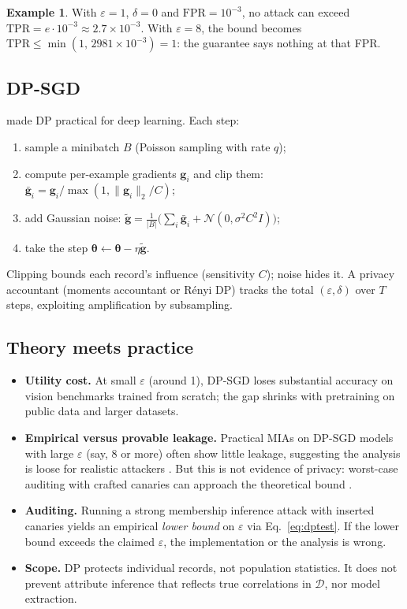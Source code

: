 \documentclass[10pt,a4paper]{extarticle}
\theoremstyle{definition}
\newtheorem{example}{Example}[section]
\newcommand{\D}{\mathcal{D}}
\newcommand{\btheta}{\boldsymbol{\theta}}
\begin{document}
\begin{example}
With \(\varepsilon=1\), \(\delta=0\) and \(\mathrm{FPR}=10^{-3}\), no attack can exceed \(\mathrm{TPR}=e\cdot10^{-3}\approx 2.7\times10^{-3}\). With \(\varepsilon=8\), the bound becomes \(\mathrm{TPR}\le\min(1,\,2981\times10^{-3})=1\): the guarantee says nothing at that FPR.
\end{example}

\subsection{DP-SGD}

\citet{abadi2016deep} made DP practical for deep learning. Each step:
\begin{enumerate}
  \item sample a minibatch \(B\) (Poisson sampling with rate \(q\));
  \item compute per-example gradients \(\mathbf{g}_i\) and clip them: \(\bar{\mathbf{g}}_i=\mathbf{g}_i/\max(1,\|\mathbf{g}_i\|_2/C)\);
  \item add Gaussian noise: \(\tilde{\mathbf{g}}=\frac{1}{|B|}\big(\sum_i\bar{\mathbf{g}}_i+\mathcal{N}(0,\sigma^2C^2I)\big)\);
  \item take the step \(\btheta\leftarrow\btheta-\eta\tilde{\mathbf{g}}\).
\end{enumerate}
Clipping bounds each record's influence (sensitivity \(C\)); noise hides it. A privacy accountant (moments accountant or Rényi DP) tracks the total \((\varepsilon,\delta)\) over \(T\) steps, exploiting amplification by subsampling.

\subsection{Theory meets practice}

\begin{itemize}
  \item \textbf{Utility cost.} At small \(\varepsilon\) (around 1), DP-SGD loses substantial accuracy on vision benchmarks trained from scratch; the gap shrinks with pretraining on public data and larger datasets.
  \item \textbf{Empirical versus provable leakage.} Practical MIAs on DP-SGD models with large \(\varepsilon\) (say, 8 or more) often show little leakage, suggesting the analysis is loose for realistic attackers \citep{jayaraman2019evaluating}. But this is not evidence of privacy: worst-case auditing with crafted canaries can approach the theoretical bound \citep{jagielski2020auditing,nasr2021adversary}.
  \item \textbf{Auditing.} Running a strong membership inference attack with inserted canaries yields an empirical \emph{lower bound} on \(\varepsilon\) via Eq.~\eqref{eq:dptest}. If the lower bound exceeds the claimed \(\varepsilon\), the implementation or the analysis is wrong.
  \item \textbf{Scope.} DP protects individual records, not population statistics. It does not prevent attribute inference that reflects true correlations in \(\D\), nor model extraction.
\end{itemize}
\end{document}
